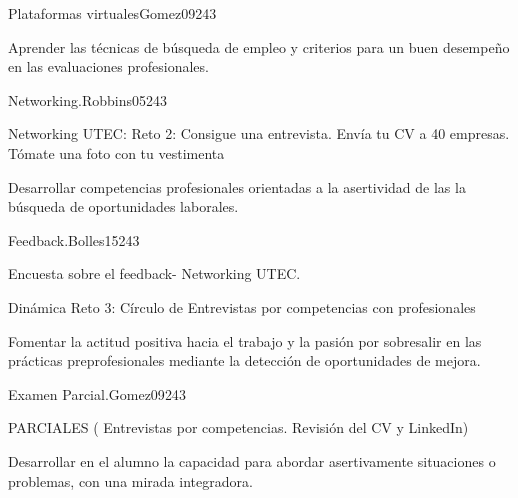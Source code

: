 \begin{syllabus}
\begin{unit}{Plataformas virtuales}{}{Gomez09}{24}{3}
   \begin{learningoutcomes}
      \item Aprender las técnicas de búsqueda de empleo y criterios para un buen desempeño en las evaluaciones profesionales.
   \end{learningoutcomes}
\end{unit}

\begin{unit}{Networking.}{}{Robbins05}{24}{3}
   \begin{topics}
      \item Networking UTEC: Reto 2: Consigue una entrevista. Envía tu CV a 40 empresas. Tómate una foto con tu vestimenta
   \end{topics}

   \begin{learningoutcomes}
      \item Desarrollar competencias profesionales orientadas a la asertividad de las la búsqueda de oportunidades laborales.
   \end{learningoutcomes}
\end{unit}

\begin{unit}{Feedback.}{}{Bolles15}{24}{3}
   \begin{topics}
      \item Encuesta sobre el feedback- Networking UTEC.
      \item Dinámica Reto 3: Círculo de Entrevistas por competencias con profesionales
   \end{topics}

   \begin{learningoutcomes}
      \item Fomentar la actitud positiva hacia el trabajo y la pasión por sobresalir en las prácticas preprofesionales mediante la detección de oportunidades de mejora.
   \end{learningoutcomes}
\end{unit}

\begin{unit}{Examen Parcial.}{}{Gomez09}{24}{3}
   \begin{topics}
      \item PARCIALES ( Entrevistas por competencias. Revisión del CV y LinkedIn) 
   \end{topics}

   \begin{learningoutcomes}
      \item Desarrollar en el alumno la capacidad para abordar asertivamente situaciones o problemas, con una mirada integradora.
   \end{learningoutcomes}
\end{unit}


\end{syllabus}

